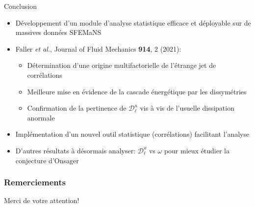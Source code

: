\documentclass[aspectratio=169,usenames,dvipsnames]{beamer}
\begin{document}
\begin{frame}{Conclusion}
\begin{itemize}[label=]
    \item Développement d'un module d'analyse statistique efficace et déployable sur
          de massives données SFEMaNS\pause
    \item Faller \emph{et al.}, Journal of Fluid Mechanics {\bf 914}, 2 (2021)\pause:
    \begin{itemize}[label=]
        \item Détermination d'une origine multifactorielle de l'étrange jet de corrélations\pause
        \item Meilleure mise en évidence de la cascade énergétique par les dissymétries\pause
        \item Confirmation de la pertinence de $\mathscr{D}^u_\ell$ vis à vis de l'usuelle dissipation anormale\pause
    \end{itemize}
    \item Implémentation d'un nouvel outil statistique (corrélations) facilitant l'analyse\pause
    \item D'autres résultats à désormais analyser: $\mathscr{D}^u_\ell$ vs $\omega$ 
          pour mieux étudier la conjecture d'Onsager
\end{itemize}
\end{frame}

\begin{frame}[plain,c]
    \frametitle{Remerciements}
    \begin{center}
    \Huge Merci de votre attention!
    \end{center}
\end{frame}
\end{document}
